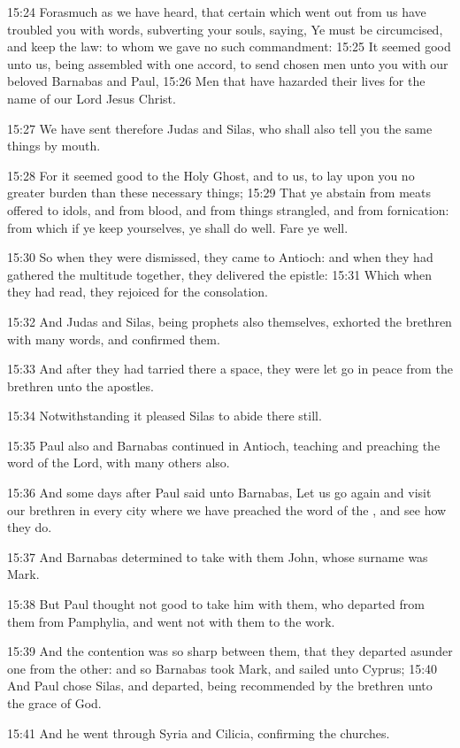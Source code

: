 15:24 Forasmuch as we have heard, that certain which went out from us have troubled you with words, subverting your souls, saying, Ye must be circumcised, and keep the law: to whom we gave no such commandment: 15:25 It seemed good unto us, being assembled with one accord, to send chosen men unto you with our beloved Barnabas and Paul, 15:26 Men that have hazarded their lives for the name of our Lord Jesus Christ.

15:27 We have sent therefore Judas and Silas, who shall also tell you the same things by mouth.

15:28 For it seemed good to the Holy Ghost, and to us, to lay upon you no greater burden than these necessary things; 15:29 That ye abstain from meats offered to idols, and from blood, and from things strangled, and from fornication: from which if ye keep yourselves, ye shall do well. Fare ye well.

15:30 So when they were dismissed, they came to Antioch: and when they had gathered the multitude together, they delivered the epistle: 15:31 Which when they had read, they rejoiced for the consolation.

15:32 And Judas and Silas, being prophets also themselves, exhorted the brethren with many words, and confirmed them.

15:33 And after they had tarried there a space, they were let go in peace from the brethren unto the apostles.

15:34 Notwithstanding it pleased Silas to abide there still.

15:35 Paul also and Barnabas continued in Antioch, teaching and preaching the word of the Lord, with many others also.

15:36 And some days after Paul said unto Barnabas, Let us go again and visit our brethren in every city where we have preached the word of the \LORD, and see how they do.

15:37 And Barnabas determined to take with them John, whose surname was Mark.

15:38 But Paul thought not good to take him with them, who departed from them from Pamphylia, and went not with them to the work.

15:39 And the contention was so sharp between them, that they departed asunder one from the other: and so Barnabas took Mark, and sailed unto Cyprus; 15:40 And Paul chose Silas, and departed, being recommended by the brethren unto the grace of God.

15:41 And he went through Syria and Cilicia, confirming the churches.

